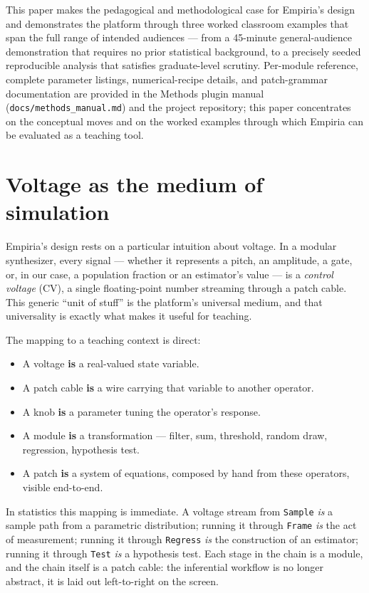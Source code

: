 This paper makes the pedagogical and methodological case for
Empiria's design and demonstrates the platform through three worked
classroom examples that span the full range of intended audiences
--- from a 45-minute general-audience demonstration that requires no
prior statistical background, to a precisely seeded reproducible
analysis that satisfies graduate-level scrutiny. Per-module
reference, complete parameter listings, numerical-recipe details,
and patch-grammar documentation are provided in the Methods plugin
manual (\texttt{docs/methods\_manual.md}) and the project
repository; this paper concentrates on the conceptual moves and on
the worked examples through which Empiria can be evaluated as a
teaching tool.

\section{Voltage as the medium of simulation}\label{voltage-as-medium}

Empiria's design rests on a particular intuition about voltage. In
a modular synthesizer, every signal --- whether it represents a
pitch, an amplitude, a gate, or, in our case, a population
fraction or an estimator's value --- is a \emph{control voltage}
(CV), a single floating-point number streaming through a patch
cable. This generic ``unit of stuff'' is the platform's universal
medium, and that universality is exactly what makes it useful for
teaching.

The mapping to a teaching context is direct:

\begin{itemize}
\tightlist
\item A voltage \textbf{is} a real-valued state variable.
\item A patch cable \textbf{is} a wire carrying that variable to
      another operator.
\item A knob \textbf{is} a parameter tuning the operator's response.
\item A module \textbf{is} a transformation --- filter, sum,
      threshold, random draw, regression, hypothesis test.
\item A patch \textbf{is} a system of equations, composed by hand
      from these operators, visible end-to-end.
\end{itemize}

In statistics this mapping is immediate. A voltage stream from
\texttt{Sample} \emph{is} a sample path from a parametric
distribution; running it through \texttt{Frame} \emph{is} the act of
measurement; running it through \texttt{Regress} \emph{is} the
construction of an estimator; running it through \texttt{Test}
\emph{is} a hypothesis test. Each stage in the chain is a module,
and the chain itself is a patch cable: the inferential workflow is
no longer abstract, it is laid out left-to-right on the screen.

